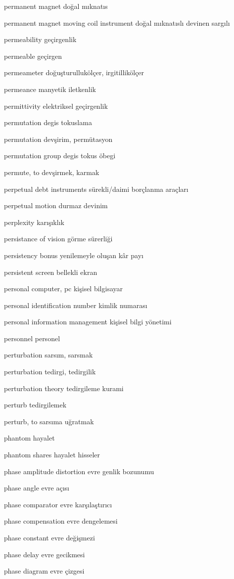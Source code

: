 \documentclass[12pt,fleqn]{article}\usepackage{../../common}
\begin{document}
permanent magnet doğal mıknatıs

permanent magnet moving coil instrument doğal mıknatıslı devinen sargılı

permeability geçirgenlik

permeable geçirgen

permeameter doğuşturullukölçer, irgitillikölçer

permeance manyetik iletkenlik

permittivity elektriksel geçirgenlik

permutation degis tokuslama

permutation devşirim, permütasyon

permutation group degis tokus öbegi

permute, to devşirmek, karmak

perpetual debt instruments sürekli/daimi borçlanma araçları

perpetual motion durmaz devinim

perplexity karışıklık

persistance of vision görme sürerliği

persistency bonus yenilemeyle oluşan kâr payı

persistent screen bellekli ekran

personal computer, pc kişisel bilgisayar

personal identification number kimlik numarası

personal information management kişisel bilgi yönetimi

personnel personel

perturbation sarsım, sarsmak

perturbation tedirgi, tedirgilik

perturbation theory tedirgileme kurami

perturb tedirgilemek

perturb, to sarsıma uğratmak

phantom hayalet

phantom shares hayalet hisseler

phase amplitude distortion evre genlik bozunumu

phase angle evre açısı

phase comparator evre karşılaştırıcı

phase compensation evre dengelemesi

phase constant evre değişmezi

phase delay evre gecikmesi

phase diagram evre çizgesi
\end{document}
